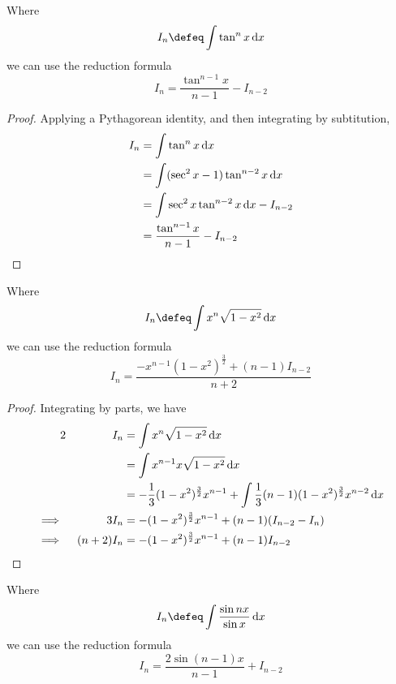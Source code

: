 \begin{theorem}
 Where
 \begin{equation*}
  I_n \defeq \integ{\tan^n x}{x}
 \end{equation*}
 we can use the reduction formula
 \begin{equation*}
  I_n = \frac{\tan^{n - 1} x}{n - 1} - I_{n - 2}
 \end{equation*}
\end{theorem}
\begin{proof}
 Applying a Pythagorean identity, and then integrating by subtitution,
 \begin{align*}
  I_n &= \integ{\tan^n x}{x} \\
      &= \integ{(\sec^2 x - 1) \tan^{n - 2} x}{x} \\
      &= \integ{\sec^2 x \tan^{n - 2} x}{x} - I_{n - 2} \\
      &= \frac{\tan^{n - 1} x}{n - 1} - I_{n - 2} \qedhere
 \end{align*}
\end{proof}
\begin{theorem}
 Where
 \begin{equation*}
  I_n \defeq \integ{x^n \sqrt{1 - x^2}}{x}
 \end{equation*}
 we can use the reduction formula
 \begin{equation*}
  I_n = \frac{-x^{n - 1}(1 - x^2)^{\frac 32} + (n - 1) I_{n - 2}}{n + 2}
 \end{equation*}
\end{theorem}
\begin{proof}
 Integrating by parts, we have
 \begin{alignat*}2
  && I_n &= \integ{x^n \sqrt{1 - x^2}}{x} \\
  &&     &= \integ{x^{n - 1} x \sqrt{1 - x^2}}{x} \\
  &&     &= -\frac 13 (1 - x^2)^{\frac 32} x^{n - 1} +
            \integ{\frac 13 (n - 1)(1 - x^2)^{\frac 32}x^{n - 2}}{x} \\
  \implies{}&& 3 I_n
         &= -(1 - x^2)^{\frac 32} x^{n - 1} +
            (n - 1)(I_{n - 2} - I_n) \\
  \implies{}&& (n + 2)I_n
         &= -(1 - x^2)^{\frac 32} x^{n - 1} +
            (n - 1)I_{n - 2} \qedhere
 \end{alignat*}
\end{proof}
\begin{theorem}
 Where
 \begin{equation*}
  I_n \defeq \integ{\frac{\sin nx}{\sin x}}{x}
 \end{equation*}
 we can use the reduction formula
 \begin{equation*}
  I_n = \frac{2 \sin (n - 1) x}{n - 1} + I_{n - 2}
 \end{equation*}
\end{theorem}
